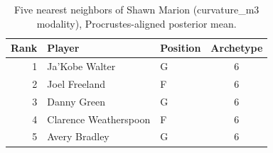 \begin{table}[htbp]
  \centering\small
  \begin{tabular}{rllc}
    \toprule
    Rank & Player & Position & Archetype \\
    \midrule
    1 & Ja'Kobe Walter & G & 6 \\
    2 & Joel Freeland & F & 6 \\
    3 & Danny Green & G & 6 \\
    4 & Clarence Weatherspoon & F & 6 \\
    5 & Avery Bradley & G & 6 \\
    \bottomrule
  \end{tabular}
  \caption{Five nearest neighbors of Shawn Marion (curvature_m3 modality), Procrustes-aligned posterior mean.}
  \label{tab:Shawn_Marion_neighbors_curvature_m3}
\end{table}

